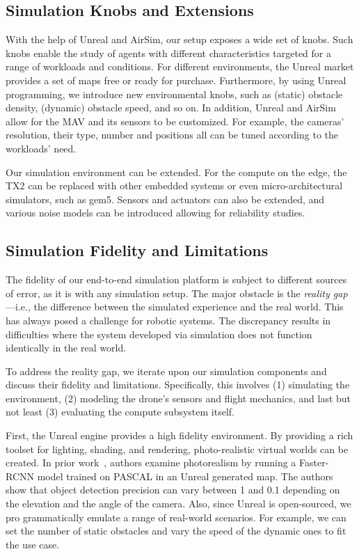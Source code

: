 {\subsection{Simulation Knobs and Extensions}
\label{sec:knobs}

With the help of Unreal and AirSim, our setup exposes a wide set of knobs. Such knobs enable the study of agents with different characteristics targeted for a range of workloads and conditions. For different environments, the Unreal market provides a set of maps free or ready for purchase. Furthermore, by using Unreal programming, we introduce new environmental knobs, such as (static) obstacle density, (dynamic) obstacle speed, and so on. In addition, Unreal and AirSim allow for the MAV and its sensors to be customized. For example, the cameras' resolution, their type, number and positions all can be tuned according to the workloads' need.   

Our simulation environment can be extended. For the compute on the edge, the TX2 can be replaced with other embedded systems or even micro-architectural simulators, such as gem5. Sensors and actuators can also be extended, and various noise models can be introduced allowing for reliability studies. 

\subsection{Simulation Fidelity and Limitations}
\label{sec:accuracy}

The fidelity of our end-to-end simulation platform is subject to different sources of error, as it is with any simulation setup. The major obstacle is the \textit{reality gap}---i.e., the difference between the simulated experience and the real world. This has always posed a challenge for robotic systems. The discrepancy results in difficulties where the system developed via simulation does not function identically in the real world. 

To address the reality gap, we iterate upon our simulation components and discuss their fidelity and limitations. Specifically, this involves (1) simulating the environment, (2) modeling the drone's sensors and flight mechanics, and last but not least (3) evaluating the compute subsystem itself.

First, the Unreal engine provides a high fidelity environment. By providing a rich toolset for lighting, shading, and rendering, photo-realistic virtual worlds can be created. In prior work~\cite{unrealcv}, authors examine photorealism by running a Faster-RCNN model trained on PASCAL in an Unreal generated map. The authors show that object detection precision can vary between 1 and 0.1 depending on the elevation and the angle of the camera. Also, since Unreal is open-sourced, we pro grammatically emulate a range of real-world scenarios. For example, we can set the number of static obstacles and vary the speed of the dynamic ones to fit the use case.   

}
